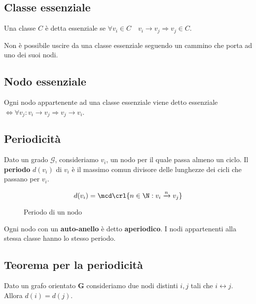 \documentclass[\main/main.tex]{subfiles}
\begin{document}
\subsection{Classe essenziale}
Una classe \(C\) è detta essenziale se \(\forall v_i \in C \quad v_i \rightarrow v_j \Rightarrow v_j \in C\).

Non è possibile uscire da una classe essenziale seguendo un cammino che porta ad uno dei suoi nodi.

\subsection{Nodo essenziale}
Ogni nodo appartenente ad una classe essenziale viene detto essenziale \(\Leftrightarrow \forall v_j: v_i \rightarrow v_j \Rightarrow v_j \rightarrow v_i\).

\subsection{Periodicità}
Dato un grado \(\mathcal{G}\), consideriamo \(v_i\), un nodo per il quale passa almeno un ciclo. Il \textbf{periodo} \(d(v_i)\) di \(v_i\) è il massimo comun divisore delle lunghezze dei cicli che passano per \(v_i\).

\begin{figure}
  \[
    d(v_i) = \mcd\crl{n \in \N: v_i\xrightarrow{n}v_j}
  \]
  \caption{Periodo di un nodo}
\end{figure}

Ogni nodo con un \textbf{auto-anello} è detto \textbf{aperiodico}. I nodi appartenenti alla stessa classe hanno lo stesso periodo.

\subsection{Teorema per la periodicità}
\begin{theorem}
  Dato un grafo orientato \(\bm{G}\) consideriamo due nodi distinti \(i,j\) tali che \(i \leftrightarrow j\). Allora \(d(i)=d(j)\).
\end{theorem}
\end{document}
